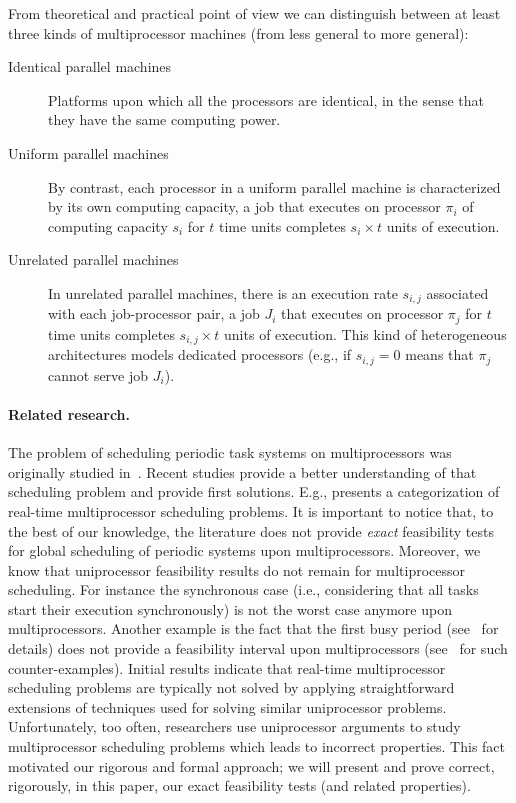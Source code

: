 \documentclass[a4paper,11pt]{article}
\begin{document}
From theoretical and practical point of view we can distinguish between at
least three kinds of multiprocessor machines (from less
general to more general):

\begin{description}
\item[Identical parallel machines] Platforms upon which
all the processors are identical, in the sense that they have the same
computing power.

\item[Uniform parallel machines] By contrast, each processor in a
uniform parallel machine is characterized by its own computing
capacity, a job that executes on processor $\pi_i$ of computing capacity
$s_i$ for $t$ time units completes $s_i \times t$ units of execution.

\item[Unrelated parallel machines] In unrelated parallel
machines, there is an execution rate $s_{i,j}$ associated with each
job-processor pair, a job $J_i$ that executes on processor
$\pi_j$ for $t$ time units completes $s_{i,j} \times t$ units of execution. This kind of heterogeneous architectures models dedicated processors (e.g., if $s_{i,j}=0$ means that $\pi_j$ cannot serve job $J_{i}$).
\end{description}

\paragraph{Related research.} The problem of scheduling periodic task
systems on multiprocessors was originally studied
in~\cite{liu2}. Recent studies provide a better understanding of that
scheduling problem and provide first solutions. E.g., \cite{carpenter}
presents a categorization of real-time multiprocessor scheduling
problems. It is important to notice that, to the best of our
knowledge, the literature does not provide \emph{exact} feasibility
tests for global scheduling of periodic systems upon
multiprocessors. Moreover, we know that uniprocessor feasibility
results do not remain for multiprocessor scheduling. For instance the
synchronous case (i.e., considering that all tasks start their
execution synchronously) is not the worst case anymore upon
multiprocessors. Another example is the fact that the first busy
period (see~\cite{Lehoczky90} for details) does not provide a
feasibility interval upon multiprocessors (see~\cite{goossens4} for
such counter-examples). Initial results indicate that real-time
multiprocessor scheduling problems are typically not solved by
applying straightforward extensions of techniques used for solving
similar uniprocessor problems. Unfortunately, too often, researchers
use uniprocessor arguments to study multiprocessor scheduling problems
which leads to incorrect properties. This fact motivated our rigorous
and formal approach; we will present and prove correct, rigorously,
in this paper, our exact feasibility tests (and related properties).
\end{document}

